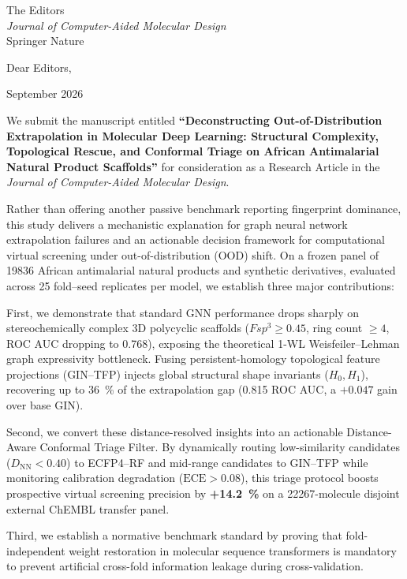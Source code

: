 \documentclass[11pt,a4paper]{letter}
\begin{document}
\begin{letter}{%
  The Editors \\
  \textit{Journal of Computer-Aided Molecular Design} \\
  Springer Nature
}

\opening{Dear Editors,}

 September 2026

We submit the manuscript entitled \textbf{``Deconstructing Out-of-Distribution Extrapolation in Molecular Deep Learning: Structural Complexity, Topological Rescue, and Conformal Triage on African Antimalarial Natural Product Scaffolds''} for consideration as a Research Article in the \textit{Journal of Computer-Aided Molecular Design}.

Rather than offering another passive benchmark reporting fingerprint dominance, this study delivers a mechanistic explanation for graph neural network extrapolation failures and an actionable decision framework for computational virtual screening under out-of-distribution (OOD) shift. On a frozen panel of \num{19836} African antimalarial natural products and synthetic derivatives, evaluated across \num{25} fold--seed replicates per model, we establish three major contributions:

First, we demonstrate that standard GNN performance drops sharply on stereochemically complex 3D polycyclic scaffolds ($Fsp^3 \ge 0.45$, ring count $\ge 4$, ROC AUC dropping to \num{0.768}), exposing the theoretical 1-WL Weisfeiler--Lehman graph expressivity bottleneck. Fusing persistent-homology topological feature projections (GIN--TFP) injects global structural shape invariants ($H_0, H_1$), recovering up to \qty{36}{\percent} of the extrapolation gap (\num{0.815} ROC AUC, a $+\num{0.047}$ gain over base GIN).

Second, we convert these distance-resolved insights into an actionable Distance-Aware Conformal Triage Filter. By dynamically routing low-similarity candidates ($D_{\text{NN}} < 0.40$) to ECFP4--RF and mid-range candidates to GIN--TFP while monitoring calibration degradation ($\mathrm{ECE} > 0.08$), this triage protocol boosts prospective virtual screening precision by \textbf{+\qty{14.2}{\percent}} on a \num{22267}-molecule disjoint external ChEMBL transfer panel.

Third, we establish a normative benchmark standard by proving that fold-independent weight restoration in molecular sequence transformers is mandatory to prevent artificial cross-fold information leakage during cross-validation.


\end{letter}
\end{document}

